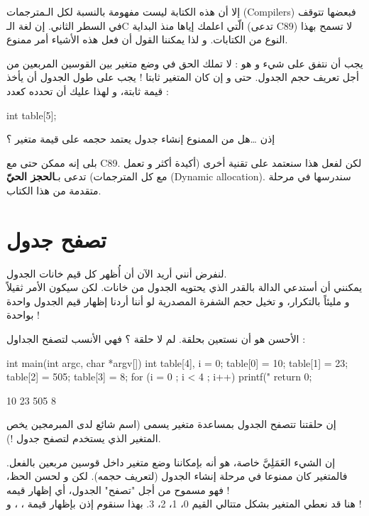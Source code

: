 إلا أن هذه الكتابة ليست مفهومة بالنسبة لكل الـمترجمات
(\textenglish{Compilers})
فبعضها تتوقف في السطر الثاني. إن لغة
الـ\textenglish{C}
الّتي اعلمك إياها منذ البداية (تدعى
\textenglish{C89})
لا تسمح بهذا النوع من الكتابات. و لذا يمكننا القول أن فعل هذه الأشياء أمر ممنوع.

يجب أن نتفق على شيء و هو : لا تملك الحق في وضع متغير بين القوسين المربعين من أجل تعريف حجم الجدول. حتى و إن كان المتغير ثابتا ! يجب على طول الجدول أن يأخذ قيمة ثابتة، و لهذا عليك أن تحدده كعدد :
\begin{Csource}
int table[5];
\end{Csource}

\begin{question}
   إذن \dots هل من الممنوع إنشاء جدول يعتمد حجمه على قيمة متغير ؟
\end{question}

بلى إنه ممكن حتى مع
\textenglish{C89}.
لكن لفعل هذا سنعتمد على تقنية أخرى (أكيدة أكثر و تعمل مع كل المترجمات) تدعى بـ\textbf{الحجز الحيّ}
(\textenglish{Dynamic allocation}).
سندرسها في مرحلة متقدمة من هذا الكتاب.

\section{تصفح جدول}

لنفرض أنني أريد الآن أن أُظهر كل قيم خانات الجدول.\\
يمكنني أن أستدعي الدالة
بالقدر الذي يحتويه الجدول من خانات. لكن سيكون الأمر ثقيلاً و مليئاً بالتكرار، و تخيل حجم الشفرة المصدرية لو أننا أردنا إظهار قيم الجدول واحدة بواحدة !

الأحسن هو أن نستعين بحلقة. لم لا حلقة
؟ فهي الأنسب لتصفح الجداول :

\begin{Csource}
int main(int argc, char *argv[])
{
	int table[4], i = 0;
	table[0] = 10;
	table[1] = 23;
	table[2] = 505;
	table[3] = 8;
	for (i = 0 ; i < 4 ; i++)
	{
    		printf("%
	}
	return 0;
}
\end{Csource}

\begin{Console}
10
23
505
8
\end{Console}

إن حلقتنا تتصفح الجدول بمساعدة متغير يسمى
(اسم شائع لدى المبرمجين يخص المتغير الذي يستخدم لتصفح جدول !).

إن الشيء العَمَلِيَّ خاصة، هو أنه بإمكاننا وضع متغير داخل قوسين مربعين بالفعل. فالمتغير كان ممنوعا في مرحلة إنشاء الجدول (لتعريف حجمه). لكن و لحسن الحظ، فهو مسموح من أجل "تصفح" الجدول، أي إظهار قيمه !\\
هنا قد نعطي المتغير
بشكل متتالي القيم 0، 1، 2، 3. بهذا سنقوم إذن بإظهار قيمة
،
،
و
 !

